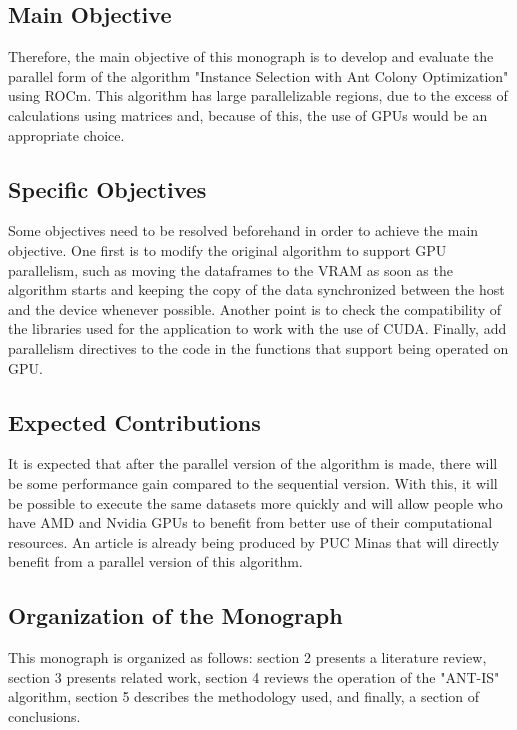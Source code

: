 \subsection{Main Objective}

Therefore, the main objective of this monograph is to develop and evaluate the parallel form of the algorithm "Instance Selection with Ant Colony Optimization" using ROCm. This algorithm has large parallelizable regions, due to the excess of calculations using matrices and, because of this, the use of GPUs would be an appropriate choice.

\subsection{Specific Objectives}

Some objectives need to be resolved beforehand in order to achieve the main objective. One first is to modify the original algorithm to support GPU parallelism, such as moving the dataframes to the VRAM as soon as the algorithm starts and keeping the copy of the data synchronized between the host and the device whenever possible. Another point is to check the compatibility of the libraries used for the application to work with the use of CUDA. Finally, add parallelism directives to the code in the functions that support being operated on GPU.

\subsection{Expected Contributions}

It is expected that after the parallel version of the algorithm is made, there will be some performance gain compared to the sequential version. With this, it will be possible to execute the same datasets more quickly and will allow people who have AMD and Nvidia GPUs to benefit from better use of their computational resources. An article is already being produced by PUC Minas that will directly benefit from a parallel version of this algorithm.

\subsection{Organization of the Monograph}

This monograph is organized as follows: section 2 presents a literature review, section 3 presents related work, section 4 reviews the operation of the "ANT-IS" algorithm, section 5 describes the methodology used, and finally, a section of conclusions.
